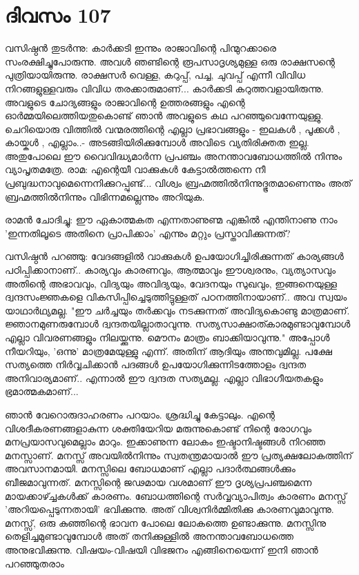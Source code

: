  
\section{ദിവസം 107}


വസിഷ്ഠന്‍ തുടര്‍ന്നു: കാര്‍ക്കടി ഇന്നും രാജാവിന്റെ പിന്മുറക്കാരെ സംരക്ഷിച്ചുപോരുന്നു. അവള്‍ ഞണ്ടിന്റെ രൂപസാദൃശ്യമുള്ള ഒരു രാക്ഷസന്റെ പുത്രിയായിരുന്നു. രാക്ഷസര്‍ വെള്ള, കറുപ്പ്‌, പച്ച, ചുവപ്പ്‌ എന്നീ വിവിധ നിറങ്ങളുള്ളവരും വിവിധ തരക്കാരുമാണ്‌... കാര്‍ക്കടി കറുത്തവളായിരുന്നു. അവളുടെ ചോദ്യങ്ങളും രാജാവിന്റെ ഉത്തരങ്ങളും എന്റെ ഓര്‍മ്മയിലെത്തിയതുകൊണ്ട്‌ ഞാന്‍ അവളുടെ കഥ പറഞ്ഞുവെന്നേയുള്ളു. ചെറിയൊരു വിത്തില്‍ വന്മരത്തിന്റെ എല്ലാ പ്രഭാവങ്ങളും - ഇലകള്‍ , പൂക്കള്‍ , കായ്കള്‍ , എല്ലാം..- അടങ്ങിയിരിക്കുമ്പോള്‍ അവിടെ വ്യതിരിക്തത ഇല്ല. അതുപോലെ ഈ വൈവിദ്ധ്യമാര്‍ന്ന പ്രപഞ്ചം അനന്താവബോധത്തില്‍ നിന്നും വ്യാപൃതമത്രേ. രാമ: എന്റെയീ വാക്കുകള്‍ കേട്ടാല്‍ത്തന്നെ നീ പ്രബുദ്ധനാവുമെന്നെനിക്കുറപ്പുണ്ട്‌... വിശ്വം ബ്രഹ്മത്തില്‍നിന്നുദ്ഭൂതമാണെന്നും അത്‌ ബ്രഹ്മത്തില്‍നിന്നും വിഭിന്നമല്ലെന്നും അറിയുക.

രാമന്‍ ചോദിച്ചു: ഈ ഏകാത്മകത എന്നതാണുണ്മ എങ്കില്‍ എന്തിനാണു നാം 'ഇന്നതിലൂടെ അതിനെ പ്രാപിക്കാം' എന്നും മറ്റും പ്രസ്താവിക്കുന്നത്‌?

വസിഷ്ഠന്‍ പറഞ്ഞു: വേദങ്ങളില്‍ വാക്കുകള്‍ ഉപയോഗിച്ചിരിക്കുന്നത്‌ കാര്യങ്ങള്‍ പഠിപ്പിക്കാനാണ്‌.. കാര്യവും കാരണവും, ആത്മാവും ഈശ്വരനും, വ്യത്യാസവും അതിന്റെ അഭാവവും, വിദ്യയും അവിദ്യയും, വേദനയും സുഖവും, ഇങ്ങനെയുള്ള ദ്വന്ദസംജ്ഞകളെ വികസിപ്പിച്ചെടുത്തിട്ടുള്ളത്‌ പഠനത്തിനായാണ്‌.. അവ സ്വയം യാഥാര്‍ഥ്യമല്ല. "ഈ ചര്‍ച്ചയും തര്‍ക്കവും നടക്കുന്നത്‌ അവിദ്യകൊണ്ടു മാത്രമാണ്‌. ജ്ഞാനമുണരുമ്പോള്‍ ദ്വന്ദതയില്ലാതാവുന്നു. സത്യസാക്ഷാത്കാരമുണ്ടാവുമ്പോള്‍ എല്ലാ വിവരണങ്ങളും നിലയ്ക്കുന്നു. മൌനം മാത്രം ബാക്കിയാവുന്നു." അപ്പോള്‍ നീയറിയും, 'ഒന്നു' മാത്രമേയുള്ളു എന്ന്. അതിന്‌ ആദിയും അന്തവുമില്ല. പക്ഷേ സത്യത്തെ നിര്‍വ്വചിക്കാന്‍ പദങ്ങള്‍ ഉപയോഗിക്കുന്നിടത്തോളം ദ്വന്ദത അനിവാര്യമാണ്‌.. എന്നാല്‍ ഈ ദ്വന്ദത സത്യമല്ല. എല്ലാ വിഭാഗീയതകളും ഭ്രമാത്മകമാണ്‌...

ഞാന്‍ വേറൊരുദാഹരണം പറയാം. ശ്രദ്ധിച്ചു കേട്ടാലും. എന്റെ വിശദീകരണങ്ങളാകുന്ന ശക്തിയേറിയ മരുന്നുകൊണ്ട്‌ നിന്റെ രോഗവും മനപ്രയാസവുമെല്ലാം മാറും. ഇക്കാണുന്ന ലോകം ഇഷ്ടാനിഷ്ടങ്ങള്‍ നിറഞ്ഞ മനസ്സാണ്‌. മനസ്സ്‌ അവയില്‍നിന്നും സ്വതന്ത്രമായാല്‍ ഈ പ്രത്യക്ഷലോകത്തിന്‌ അവസാനമായി. മനസ്സിലെ ബോധമാണ്‌ എല്ലാ പദാര്‍ത്ഥങ്ങള്‍ക്കും ബീജമാവുന്നത്.  മനസ്സിന്റെ ജഢമായ വശമാണ്‌ ഈ ദൃശ്യപ്രപഞ്ചമെന്ന മായക്കാഴ്ച്ചകള്‍ക്ക്‌ കാരണം. ബോധത്തിന്റെ സര്‍വ്വവ്യാപിത്വം കാരണം മനസ്സ്‌ 'അറിയപ്പെടുന്നതായി' ഭവിക്കുന്നു. അത്‌ വിശ്വനിര്‍മ്മിതിക്കു കാരണവുമാവുന്നു. മനസ്സ്‌, ഒരു കുഞ്ഞിന്റെ ഭാവന പോലെ ലോകത്തെ ഉണ്ടാക്കുന്നു. മനസ്സിനു തെളിച്ചമുണ്ടാവുമ്പോള്‍ അത്‌ തനിക്കുള്ളില്‍ അനന്താവബോധത്തെ അനുഭവിക്കുന്നു. വിഷയം-വിഷയി വിഭജനം എങ്ങിനെയെന്ന് ഇനി ഞാന്‍ പറഞ്ഞുതരാം

